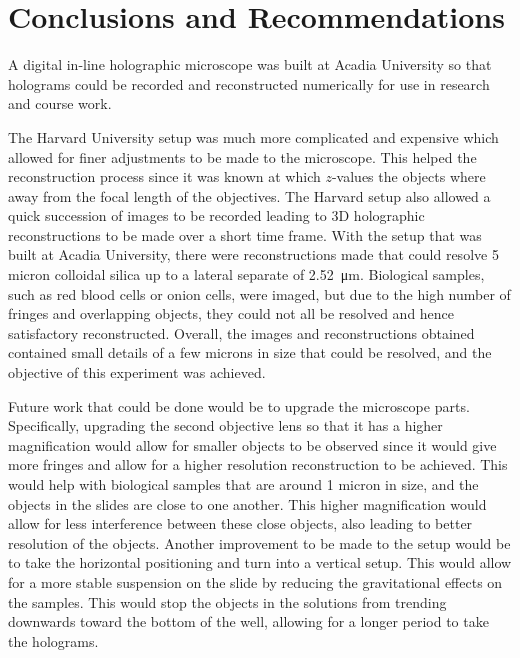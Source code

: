 %
%
\chapter{Conclusions and Recommendations} \label{chap:Conclusion}

A digital in-line holographic microscope was built at Acadia University
so that holograms could be recorded and reconstructed numerically 
for use in research and course work.

The Harvard University setup was much more complicated and expensive which
allowed for finer adjustments to be made to the microscope. This helped the
reconstruction process since it was known at which $z$-values the objects where
away from the focal length of the objectives. The Harvard setup also allowed
a quick succession of images to be recorded leading to 3D holographic
reconstructions to
be made over a short time frame.
With the
setup that was built at Acadia University, there were
reconstructions made that could resolve 5 micron colloidal silica up to a
lateral separate of \SI{2.52}{\micro\meter}. Biological
samples, such as red blood cells or onion cells, were imaged, but due to the
high number of
fringes and overlapping objects, they could not all be resolved 
and hence satisfactory reconstructed.
Overall, the images and reconstructions obtained
contained small details of a few microns in size that could be resolved,
and the objective of this experiment was achieved.

Future work that could be done would be to upgrade the microscope parts.
Specifically, upgrading the second objective lens so that it has a higher magnification
would allow for smaller objects to be observed since it would give more fringes and
allow for a higher resolution reconstruction to be achieved. This would help
with biological samples that are around 1 micron
in size, and the objects in the slides are close to one another. This higher
magnification would allow for less interference between these close objects,
also leading to better resolution of the objects. Another improvement to be
made to the setup would be to take the horizontal positioning and turn into a
vertical setup. This would allow for a more stable suspension on the slide
by reducing the gravitational effects on the samples. This would stop the
objects in the solutions from trending downwards toward the bottom of the well, allowing
for a longer period to take the holograms.

